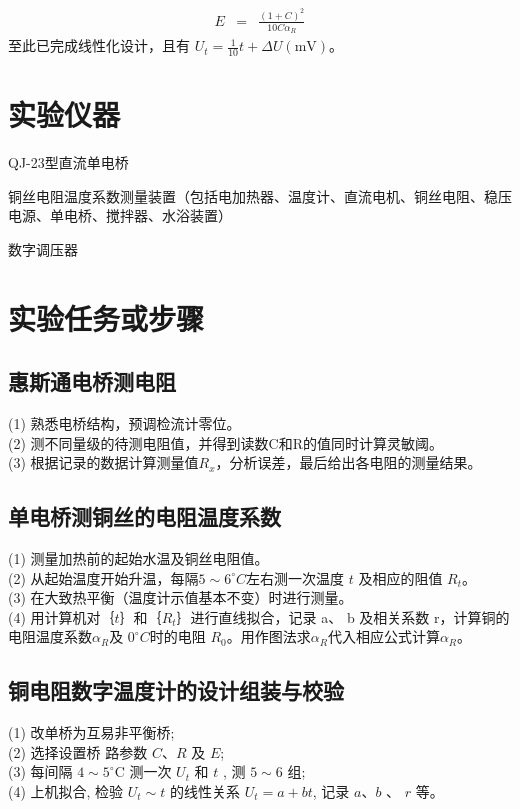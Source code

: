 \documentclass[UTF8]{ctexart}
\begin{document}
    \begin{eqnarray}
        E & = & \frac{(1+C)^{2}}{10 C \alpha_{R}}
        \end{eqnarray}
    至此已完成线性化设计，且有  $U_{t}=\frac{1}{10} t+\Delta U(\mathrm{mV}) $。



    

\section{实验仪器}
\noindent QJ-23型直流单电桥

\noindent 铜丝电阻温度系数测量装置（包括电加热器、温度计、直流电机、铜丝电阻、稳压电源、单电桥、搅拌器、水浴装置）

\noindent 数字调压器

\section{实验任务或步骤}

\subsection{惠斯通电桥测电阻}
\noindent(1) 熟悉电桥结构，预调检流计零位。\\
(2) 测不同量级的待测电阻值，并得到读数C和R的值同时计算灵敏阈。\\
(3) 根据记录的数据计算测量值$R_x$，分析误差，最后给出各电阻的测量结果。
\subsection{单电桥测铜丝的电阻温度系数}
\noindent(1) 测量加热前的起始水温及铜丝电阻值。\\
(2) 从起始温度开始升温，每隔$5\sim6^{\circ}C$左右测一次温度 $t$ 及相应的阻值 $R_t$。\\
(3) 在大致热平衡（温度计示值基本不变）时进行测量。\\
(4) 用计算机对｛$t$｝和｛$R_t$｝进行直线拟合，记录 a、 b 及相关系数 r，计算铜的电阻温度系数$\alpha_R$及
$0^{\circ}C$时的电阻 $R_0$。用作图法求$\alpha_R$代入相应公式计算$\alpha_R$。\\
\subsection{铜电阻数字温度计的设计组装与校验}

\noindent(1) 改单桥为互易非平衡桥;\\
(2) 选择设置桥 路参数  $C $、$ R$  及 $ E $;\\
(3) 每间隔 $ 4 \sim 5^{\circ} \mathrm{C}$  测一次  $U_{t} $ 和  $t$ , 测  $5 \sim 6$  组;\\
(4) 上机拟合, 检验 $ U_{t} \sim t$  的线性关系 $ U_{t}=a+b t $, 记录 $ a $、$ b$ 、 $r$  等。
\end{document}
